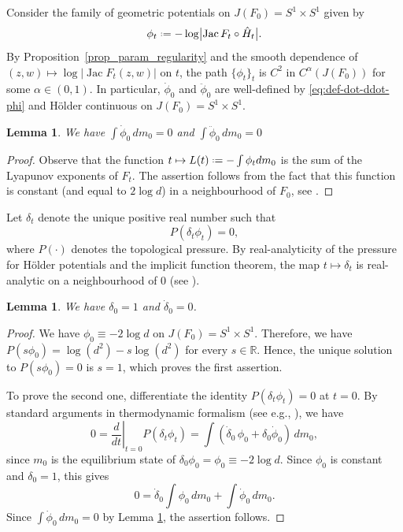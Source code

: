 \documentclass[11pt]{amsart}
\theoremstyle{plain}
\newtheorem{lem}[thm]{Lemma}
\theoremstyle{definition}
\theoremstyle{remark}
\newcommand*{\defeq}{\mathrel{\vcenter{\baselineskip0.5ex \lineskiplimit0pt
			\hbox{\scriptsize.}\hbox{\scriptsize.}}}%
	=}
\DeclareMathOperator{\Jac}{Jac}
\begin{document}
\medskip

Consider the family of geometric 
potentials on $J(F_0)=S^1 \times S^1$ 
given by
\[
\phi_t \defeq -\log \bigl|\Jac F_t \circ \hat H_t\bigr|.
\]
By Proposition~\ref{prop_param_regularity} and the smooth dependence of
$(z,w)\mapsto \log|\Jac F_t(z,w)|$ on $t$, the path $\{\phi_t\}_t$
is $C^2$ in $C^\alpha(J(F_0))$ for some $\alpha\in (0,1)$. 
In particular, $\dot \phi_0$ and $\ddot \phi_0$
 are well-defined 
 by \eqref{eq:def-dot-ddot-phi} 
 and H\"older continuous on $J(F_0)= S^1 \times S^1$.
 
 \begin{lem}\label{l:phi}
 We have $\int \dot \phi_0\, dm_0=0$ and  $\int \ddot \phi_0\, dm_0=0$
 \end{lem}
 
 \begin{proof}
 Observe that the 
 function $t\mapsto L(t)\defeq -\int \phi_t dm_0$ is the sum of the Lyapunov exponents of 
 $F_t$. The assertion follows from the fact that
  this function is constant
  (and equal to $2\log d$)
   in a neighbourhood of $F_0$, see
   \cite[Theorem 5.3]{Jonsson99}.
 \end{proof}
\medskip


Let $\delta_t$ denote the unique positive real number such that
\[
P(\delta_t \phi_t)=0,
\]
where $P(\cdot)$ denotes the topological pressure.
By real-analyticity of the pressure for H\"older potentials and the implicit function theorem,
the map $t\mapsto\delta_t$ is real-analytic on a neighbourhood of $0$
(see \cite{Ruelle82}).


\begin{lem}\label{l:delta}
We have $\delta_0=1$ and $\dot \delta_0=0$.
\end{lem}

\begin{proof}
We have $\phi_0 \equiv -2\log d$ on $J(F_0) = S^1\times S^1$.
Therefore, we have
 $P(s\phi_0)=\log(d^2)-s\log(d^2)$ for every $s\in \mathbb R$.
  Hence, the unique solution
  to $P(s\phi_0)=0$ 
  is $s=1$, which proves the first assertion.

\medskip

To prove the
 second one, differentiate the identity $P(\delta_t\phi_t)=0$ at $t=0$.
By standard arguments
in thermodynamic formalism 
(see
e.g., \cite{PU}), we have
\[
0=\left.\frac{d}{dt}\right|_{t=0}P(\delta_t\phi_t)
=\int (\dot\delta_0\,\phi_0+\delta_0\dot\phi_0)\,dm_0,
\]
since $m_0$ is the equilibrium state of $\delta_0\phi_0=\phi_0\equiv -2\log d$.
Since $\phi_0$ is constant and $\delta_0=1$, this gives
\[
0=\dot\delta_0\int\phi_0\,dm_0+\int\dot\phi_0\,dm_0.
\]
Since $\int\dot\phi_0\,dm_0=0$
by Lemma \ref{l:phi},
the assertion follows.
\end{proof}
\end{document}
